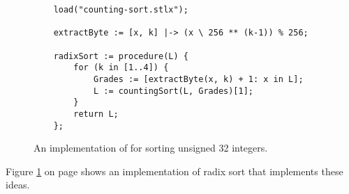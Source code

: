 \begin{figure}[!ht]
\centering
\begin{verbatim}
    load("counting-sort.stlx");
    
    extractByte := [x, k] |-> (x \ 256 ** (k-1)) % 256; 
    
    radixSort := procedure(L) {
        for (k in [1..4]) {
            Grades := [extractByte(x, k) + 1: x in L];
            L := countingSort(L, Grades)[1];
        }
        return L;
    };                  
\end{verbatim}
\vspace*{-0.3cm}
\caption{An implementation of  for sorting unsigned 32 integers.}
\label{fig:radix-sort.stlx}
\end{figure}
Figure \ref{fig:radix-sort.stlx} on page \pageref{fig:radix-sort.stlx} shows an implementation of radix
sort that implements these ideas.
